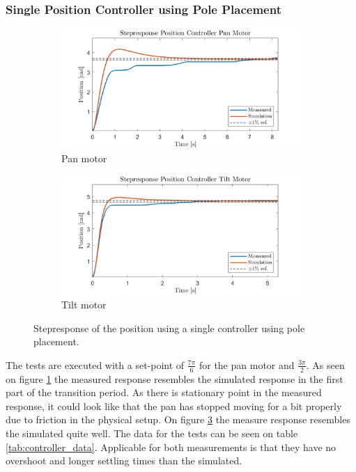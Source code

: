 \documentclass[../../main.tex]{subfiles}
\begin{document}
\subsubsection*{Single Position Controller using Pole Placement}

\begin{figure}[h]
     \centering
     \begin{subfigure}[b]{0.49\textwidth}
         \centering
         \includegraphics[width=\textwidth]{Sections/Test/Images/StepPanPosModel.png}
         \caption{Pan motor}
         \label{fig:StepPanPos}
     \end{subfigure}
     \hfill
     \begin{subfigure}[b]{0.49\textwidth}
         \centering
         \includegraphics[width=\textwidth]{Sections/Test/Images/StepTiltPosModel.png}
         \caption{Tilt motor}
         \label{fig:StepTiltPos}
     \end{subfigure}
        \caption{Stepresponse of the position using a single controller using pole placement.}
        \label{fig:singlePosController}
\end{figure}
The tests are executed with a set-point of $\frac{7\pi}{6}$ for the pan motor and $\frac{3\pi}{2}$. As seen on figure \ref{fig:StepPanPos} the measured response resembles the simulated response in the first part of the transition period. As there is stationary point in the measured response, it could look like that the pan has stopped moving for a bit properly due to friction in the physical setup. On figure \ref{fig:singlePosController} the measure response resembles the simulated quite well. The data for the tests can be seen on table \ref{tab:controller_data}. Applicable for both measurements is that they have no overshoot and longer settling times than the simulated. 
\end{document}

